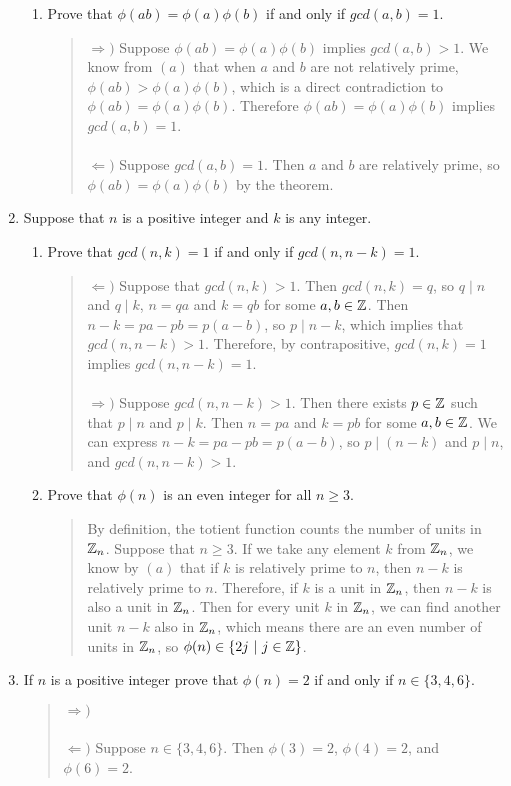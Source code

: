 \documentclass{hw}
\begin{document}
\begin{enumerate}
\begin{enumerate}
\item Prove that $\phi(ab) = \phi(a)\phi(b)$ if and only if $gcd(a,b)=1$.
\begin{quote}
$\Rightarrow)$ Suppose $\phi(ab) = \phi(a)\phi(b)$ implies $gcd(a,b)>1$. We know from $(a)$ that
when $a$ and $b$ are not relatively prime, $\phi(ab) > \phi(a)\phi(b)$, which is a direct contradiction
to $\phi(ab) = \phi(a)\phi(b)$. Therefore $\phi(ab) = \phi(a)\phi(b)$ implies $gcd(a,b)=1$.
\noindent\\\\
$\Leftarrow)$ Suppose $gcd(a,b)=1$. Then $a$ and $b$ are relatively prime, so
$\phi(ab)=\phi(a)\phi(b)$ by the theorem.
\end{quote}
\end{enumerate}

\item Suppose that $n$ is a positive integer and $k$ is any integer.
\begin{enumerate}
\item Prove that $gcd(n,k)=1$ if and only if $gcd(n,n-k)=1$.
\begin{quote}
$\Leftarrow)$ Suppose that $gcd(n,k)>1$. Then $gcd(n,k)=q$, so $q\mid n$ and
$q\mid k$, $n=qa$ and $k=qb$ for some $a,b\in\mathbb{Z}$. Then $n-k=pa-pb=p(a-b)$, so $p\mid n-k$, which
implies that $gcd(n,n-k)>1$. Therefore, by contrapositive, $gcd(n,k)=1$ implies $gcd(n,n-k)=1$.
\noindent\\\\
$\Rightarrow)$ Suppose $gcd(n,n-k)>1$. Then there exists $p\in\mathbb{Z}$ such that $p\mid n$ and $p\mid k$.
Then $n=pa$ and $k=pb$ for some $a,b\in\mathbb{Z}$. We can express $n-k=pa-pb=p(a-b)$, so $p\mid(n-k)$ and
$p\mid n$, and $gcd(n,n-k)>1$.
\end{quote}
\item Prove that $\phi(n)$ is an even integer for all $n\geq3$.
\begin{quote}
By definition, the totient function counts the number of units in $\mathbb{Z}_{n}$. Suppose that
$n\geq3$. If we take any element $k$ from $\mathbb{Z}_{n}$, we know by $(a)$ that if $k$ is relatively
prime to $n$, then $n-k$ is relatively prime to $n$. Therefore, if $k$ is a unit in $\mathbb{Z}_{n}$, then
$n-k$ is also a unit in $\mathbb{Z}_{n}$. Then for every unit $k$ in $\mathbb{Z}_{n}$, we can find another unit
$n-k$ also in $\mathbb{Z}_{n}$, which means there are an even number of units in $\mathbb{Z}_{n}$, so
$\phi(n)\in\{ 2j\ |\ j\in\mathbb{Z} \}$.
\end{quote}
\end{enumerate}

\item If $n$ is a positive integer prove that $\phi(n)=2$ if and only if $n\in\{ 3,4,6\}$.
\begin{quote}
$\Rightarrow)$
\noindent\\\\
$\Leftarrow)$ Suppose $n\in\{ 3,4,6\}$. Then $\phi(3)=2$, $\phi(4)=2$, and $\phi(6)=2$.
\end{quote}
\end{enumerate}
\end{document}

